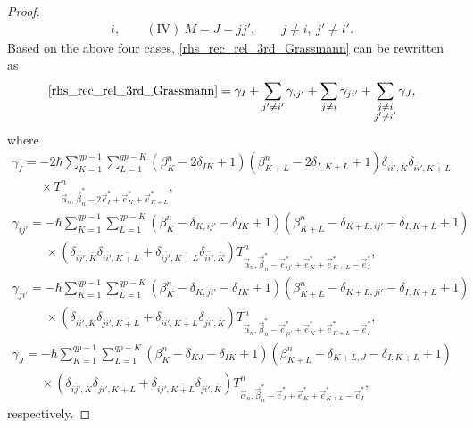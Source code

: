 \documentclass[10pt,a4paper]{amsart}
\numberwithin{equation}{section}
\begin{document}
\begin{proof}
\begin{gather*}
 i,
 \qquad
 (\textrm{IV}) \
 M=J=jj',
\qquad
 j
 \neq
 i, \
 j'
 \neq
 i'
 .
\end{gather*}
Based on the above four cases, \eqref{rhs_rec_rel_3rd_Grassmann} can be rewritten as
\begin{align*}
\eqref{rhs_rec_rel_3rd_Grassmann}
=
\gamma_{I}
+
\sum_{
j'
\neq
i'
}
\gamma_{ij'}
+
\sum_{
j
\neq
i
}
\gamma_{ji'}
+
\sum_{
\substack{
j
\neq
i
\\
j'
\neq
i'
}
}
\gamma_{J},
\end{align*}
where
\begin{gather*}
\gamma_{I}
=
 -
 2
 \hbar
 \sum_{K=1}^{qp-1}
 \sum_{L=1}^{qp-K}
 (
 \beta_{K}^{n}
 -
 2
 \delta_{IK}
 +
 1
 )
 (
 \beta_{K+L}^{n}
 -
 2
 \delta_{I,K+L}
 +
 1
 )
 \delta_{
 \overline{ii'},
 \overline{K}
 }
 \delta_{
 \overline{ii'},
 \overline{K+L}
 }\\
 \phantom{\gamma_{I}
=}{}
 \times T^{n}_{\vec{\alpha}_{n},\vec{\beta}_{n}^{\ast}-2\vec{e}_{I}^{\ast}+\vec{e}_{K}^{\ast}+\vec{e}_{K+L}^{\ast}},
\\
\gamma_{ij'}
=
 -
 \hbar
 \sum_{K=1}^{qp-1}
 \sum_{L=1}^{qp-K}
 (
 \beta_{K}^{n}
 -
 \delta_{K,ij'}
 -
 \delta_{IK}
 +
 1
 )
 (
 \beta_{K+L}^{n}
 -
 \delta_{K+L,ij'}
 -
 \delta_{I,K+L}
 +
 1
 )
 \\
\phantom{\gamma_{ij'}
=}{}
 \times
 (
 \delta_{
 \overline{ij'},
 \overline{K}
 }
 \delta_{
 \overline{ii'},
 \overline{K+L}
 }
 +
 \delta_{
 \overline{ij'},
 \overline{K+L}
 }
 \delta_{
 \overline{ii'},
 \overline{K}
 }
 )
 T^{n}_{\vec{\alpha}_{n},\vec{\beta}_{n}^{\ast}-\vec{e}_{ij'}^{\ast}
 +\vec{e}_{K}^{\ast}+\vec{e}_{K+L}^{\ast}-\vec{e}_{I}^{\ast}},
\\
\gamma_{ji'}
=
-
 \hbar
 \sum_{K=1}^{qp-1}
 \sum_{L=1}^{qp-K}
 (
 \beta_{K}^{n}
 -
 \delta_{K,ji'}
 -
 \delta_{IK}
 +
 1
 )
 (
 \beta_{K+L}^{n}
 -
 \delta_{K+L,ji'}
 -
 \delta_{I,K+L}
 +
 1
 )
 \\
\phantom{\gamma_{ji'}
=}{}
 \times
 (
 \delta_{
 \overline{ii'},
 \overline{K}
 }
 \delta_{
 \overline{ji'},
 \overline{K+L}
 }
 +
 \delta_{
 \overline{ii'},
 \overline{K+L}
 }
 \delta_{
 \overline{ji'},
 \overline{K}
 }
 )
 T^{n}_{\vec{\alpha}_{n},\vec{\beta}_{n}^{\ast}-\vec{e}_{ji'}^{\ast}+\vec{e}_{K}^{\ast}
 +\vec{e}_{K+L}^{\ast}-\vec{e}_{I}^{\ast}},
\\
\gamma_{J}
=
-
 \hbar
 \sum_{K=1}^{qp-1}
 \sum_{L=1}^{qp-K}
 (
 \beta_{K}^{n}
 -
 \delta_{KJ}
 -
 \delta_{IK}
 +
 1
 )
 (
 \beta_{K+L}^{n}
 -
 \delta_{K+L,J}
 -
 \delta_{I,K+L}
 +
 1
 ) \\
\phantom{\gamma_{J}
=}{}
 \times
 (
 \delta_{
 \overline{ij'},
 \overline{K}
 }
 \delta_{
 \overline{ji'},
 \overline{K+L}
 }
 +
 \delta_{
 \overline{ij'},
 \overline{K+L}
 }
 \delta_{
 \overline{ji'},
 \overline{K}
 }
 )
 T^{n}_{\vec{\alpha}_{n},\vec{\beta}_{n}^{\ast}-\vec{e}_{J}^{\ast}
 +\vec{e}_{K}^{\ast}+\vec{e}_{K+L}^{\ast}-\vec{e}_{I}^{\ast}},
\end{gather*}
respectively.


\end{proof}
\end{document}
